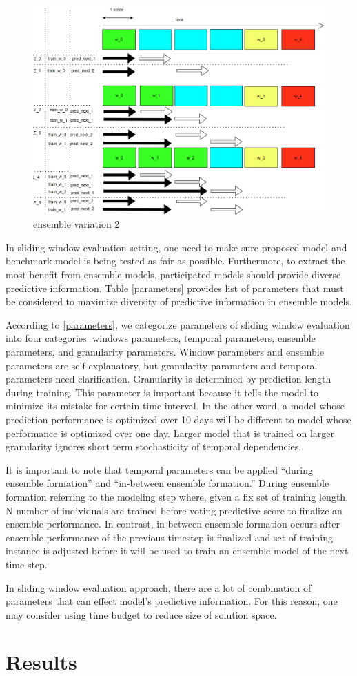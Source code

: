 \documentclass{IEEEtran}
\begin{document}
\begin{figure}[htbp]
\centering
\includegraphics[width=.9\linewidth]{./images/screenshot_20220321_124707.png}
\caption{\label{ensemble variation 2}ensemble variation 2}
\end{figure}

In sliding window evaluation setting, one need to make sure proposed model and benchmark model is being tested as fair as possible. Furthermore, to extract the most benefit from ensemble models, participated models should provide diverse predictive information. Table \ref{parameters} provides list of parameters that must be considered to maximize diversity of predictive information in ensemble models.

According to \ref{parameters}, we categorize parameters of sliding window evaluation into four categories: windows parameters, temporal parameters, ensemble parameters, and granularity parameters.
Window parameters and ensemble parameters are self-explanatory, but granularity parameters and temporal parameters need clarification. Granularity is determined by prediction length during training. This parameter is important because it tells the model to minimize its mistake for certain time interval. In the other word, a model whose prediction performance is optimized over 10 days will be different to model whose performance is optimized over one day. Larger model that is trained on larger granularity ignores short term stochasticity of temporal dependencies.

It is important to note that temporal parameters can be applied ``during ensemble formation'' and ``in-between ensemble formation.'' During ensemble formation referring to the modeling step where, given a fix set of training length, N number of individuals are trained before voting predictive score to finalize an ensemble performance. In contrast, in-between ensemble formation occurs after ensemble performance of the previous timestep is finalized and set of training instance is adjusted before it will be used to train an ensemble model of the next time step.

In sliding window evaluation approach, there are a lot of combination of parameters that can effect model's predictive information. For this reason, one may consider using time budget to reduce size of solution space.

\section{Results}
\label{sec:org015b429}
\printbibliography
\end{document}
